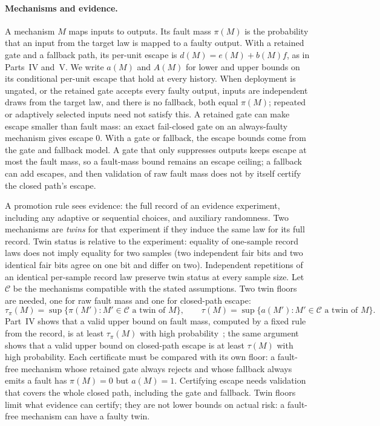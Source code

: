\documentclass[11pt]{article}
\theoremstyle{definition}
\theoremstyle{remark}
\begin{document}
\paragraph{Mechanisms and evidence.}
A mechanism $M$ maps inputs to outputs. Its fault mass $\pi(M)$ is the probability that an input
from the target law is mapped to a faulty output. With a retained gate and a fallback path, its
per-unit escape is $d(M)=e(M)+b(M)f$, as in Parts~IV and~V. We write $a(M)$ and $A(M)$ for lower and
upper bounds on its conditional per-unit escape that hold at every history. When deployment is
ungated, or the retained gate accepts every faulty output, inputs are independent draws from the target
law, and there is no fallback, both equal $\pi(M)$; repeated or adaptively selected inputs need not
satisfy this. A retained gate can make escape smaller than fault mass: an exact fail-closed gate on an
always-faulty mechanism gives escape $0$. With a gate or fallback, the escape bounds come from the gate
and fallback model. A gate that only suppresses outputs keeps escape at most the fault mass, so a
fault-mass bound remains an escape ceiling; a fallback can add escapes, and then validation of raw fault
mass does not by itself certify the closed path's escape.

A promotion rule sees evidence: the full record of an evidence experiment, including any adaptive
or sequential choices, and auxiliary randomness. Two mechanisms are \emph{twins} for that experiment if
they induce the same law for its full record. Twin status is relative to the experiment: equality of
one-sample record laws does not imply equality for two samples (two independent fair bits and two
identical fair bits agree on one bit and differ on two). Independent repetitions of an identical
per-sample record law preserve twin status at every sample size. Let $\mathcal C$ be the mechanisms
compatible with the stated assumptions. Two twin floors are needed, one for raw fault mass and one
for closed-path escape:
\[
\tau_\pi(M)=\sup\{\pi(M'):M'\in\mathcal C\text{ a twin of }M\},\qquad
\tau(M)=\sup\{a(M'):M'\in\mathcal C\text{ a twin of }M\}.
\]
Part~IV shows that a valid upper bound on fault mass, computed by a fixed rule from the record, is at
least $\tau_\pi(M)$ with high probability~\cite{p4,p5}; the same argument shows that a valid upper bound
on closed-path escape is at least $\tau(M)$ with high probability. Each certificate must be compared with
its own floor: a fault-free mechanism whose retained gate always rejects and whose fallback always emits
a fault has $\pi(M)=0$ but $a(M)=1$. Certifying escape needs validation that covers the whole closed
path, including the gate and fallback. Twin floors limit what evidence can certify; they are not lower
bounds on actual risk: a fault-free mechanism can have a faulty twin.
\end{document}

